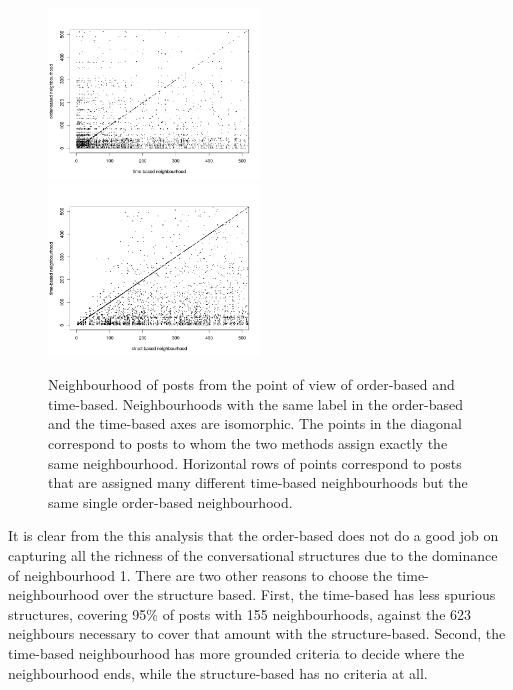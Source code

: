 \documentclass[conference]{IEEEtran}
\begin{document}
\begin{figure}
\centering
\includegraphics[width=0.5\textwidth]{confusion_time_order}%
\includegraphics[width=0.5\textwidth]{confusion_struct_time}
\caption{Neighbourhood of posts from the point of view of order-based and time-based. Neighbourhoods with the same label in the order-based and the time-based axes are isomorphic. The points in the diagonal correspond to posts to whom the two methods assign exactly the same neighbourhood. Horizontal rows of points correspond to posts that are assigned many different time-based neighbourhoods but the same single order-based neighbourhood.}
\label{fig:confusion}
\end{figure}



It is clear from the this analysis that the order-based does not do a good job on capturing all the richness of the conversational structures due to the dominance of neighbourhood 1. There are two other reasons to choose the time-neighbourhood over the structure based. First, the time-based has less spurious structures, covering 95\% of posts with 155 neighbourhoods, against the 623 neighbours necessary to cover that amount with the structure-based. Second, the time-based neighbourhood has more grounded criteria to decide where the neighbourhood ends, while the structure-based has no criteria at all.
\end{document}
